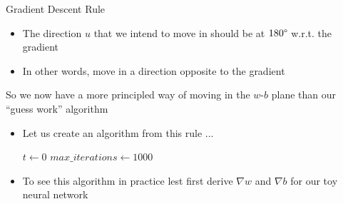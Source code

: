 \documentclass[serif, aspectratio=169]{beamer}
\begin{document}
\begin{frame}
\begin{overlayarea}{\textwidth}{\textheight}

\begin{block}{Gradient Descent Rule}
\begin{itemize}\justifying
    \item<1-> The direction $u$ that we intend to move in should be at $180\degree$ w.r.t. the gradient
    \item<2-> In other words, move in a direction opposite to the gradient
\end{itemize}
\end{block}


 {So we now have a more principled way of moving in the $w$-$b$ plane than our ``guess work'' algorithm}


\end{overlayarea}
\end{frame}

\begin{frame}
\begin{overlayarea}{\textwidth}{\textheight}

\begin{itemize}\justifying
    
\item <1-> Let us create an algorithm from this rule ... 

 {
\begin{algorithm}[H]
\SetAlgoLined
$t \leftarrow 0$\; 
$max\_iterations\leftarrow 1000$\;
 \caption{gradient\_descent()}
\end{algorithm}
}

\item <2-> To see this algorithm in practice lest first derive $\nabla w$ and $\nabla b$ for our toy neural network

\end{itemize}

\end{overlayarea}

\end{frame}
\end{document}
